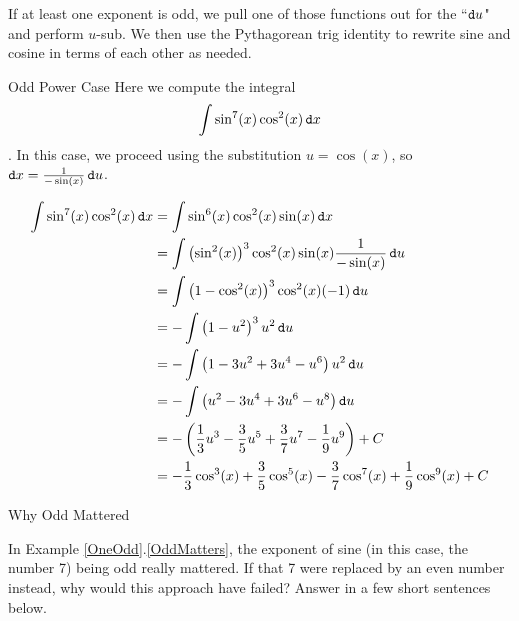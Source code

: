 If at least one exponent is odd, we pull one of those functions out for the ``$\mathop{}\!\mathtt{d} u$" and perform $u$-sub.  We then use the Pythagorean trig identity to rewrite sine and cosine in terms of each other as needed.  

\begin{example}{Odd Power Case}\label{OddMatters}
 Here we compute the integral $$\int \sin^7(x) \cos^2(x) \mathop{}\!\mathtt{d} x$$.  In this case, we proceed using the substitution $u=\cos(x)$, so $\mathop{}\!\mathtt{d} x=\frac{1}{-\sin(x)}\mathop{}\!\mathtt{d} u$.
 
\begin{align*} \int \sin^7(x) \cos^2(x) \mathop{}\!\mathtt{d} x &=\int \sin^6(x) \cos^2(x) \sin(x) \mathop{}\!\mathtt{d} x \\
&= \int \left(\sin^2(x)\right)^3 \cos^2(x) \sin(x) \frac{1}{-\sin(x)}\mathop{}\!\mathtt{d} u \\
&= \int \left(1-\cos^2(x)\right)^3 \cos^2(x) (-1) \mathop{}\!\mathtt{d} u \\
&= -\int \left(1-u^2\right)^3 u^2 \mathop{}\!\mathtt{d} u \\
&= -\int \left(1-3u^2+3u^4-u^6\right) u^2 \mathop{}\!\mathtt{d} u \\
&= -\int \left(u^2-3u^4+3u^6-u^8\right) \mathop{}\!\mathtt{d} u \\
&= -\left(\frac{1}{3}u^3-\frac{3}{5}u^5+\frac{3}{7}u^7-\frac{1}{9}u^9\right)+C \\
&= -\frac{1}{3}\cos^3(x)+\frac{3}{5}\cos^5(x)-\frac{3}{7}\cos^7(x)+\frac{1}{9}\cos^9(x)+C \\
\end{align*}

\end{example}

\begin{exercise}{Why Odd Mattered \Coffeecup}

In Example \ref{OneOdd}.\ref{OddMatters}, the exponent of sine (in this case, the number 7) being odd really mattered.  If that 7 were replaced by an even number instead, why would this approach have failed?  Answer in a few short sentences below.
\end{exercise}

